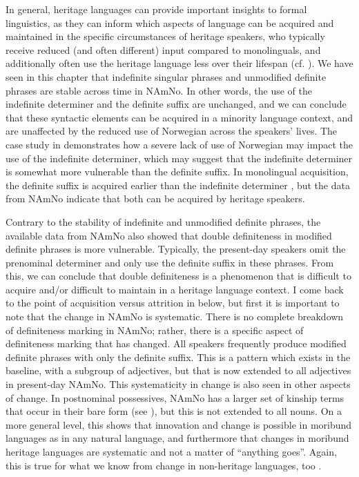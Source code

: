 \documentclass[output=paper]{langscibook}
\begin{document}
In general, heritage languages can provide important insights to formal linguistics, as they can inform which aspects of language can be acquired and maintained in the specific circumstances of heritage speakers, who typically receive reduced (and often different) input compared to monolinguals, and additionally often use the heritage language less over their lifespan (cf. \citealt{Benmamoun2021, Lohndal2021}). We have seen in this chapter that indefinite singular phrases and unmodified definite phrases are stable across time in NAmNo. In other words, the use of the indefinite determiner and the definite suffix are unchanged, and we can conclude that these syntactic elements can be acquired in a minority language context, and are unaffected by the reduced use of Norwegian across the speakers' lives. The case study in \citet{Johannessen2015Germanic} demonstrates how a severe lack of use of Norwegian may impact the use of the indefinite determiner, which may suggest that the indefinite determiner is somewhat more vulnerable than the definite suffix. In monolingual acquisition, the definite suffix is acquired earlier than the indefinite determiner \citep[229--230]{KupischEtAl2009}, but the data from NAmNo indicate that both can be acquired by heritage speakers.
 
Contrary to the stability of indefinite and unmodified definite phrases, the available data from NAmNo also showed that double definiteness in modified definite phrases is more vulnerable. Typically, the present-day speakers omit the prenominal determiner and only use the definite suffix in these phrases. From this, we can conclude that double definiteness is a phenomenon that is difficult to acquire and/or difficult to maintain in a heritage language context. I come back to the point of acquisition versus attrition in  below, but first it is important to note that the change in NAmNo is systematic. There is no complete breakdown of definiteness marking in NAmNo; rather, there is a specific aspect of definiteness marking that has changed. All speakers frequently produce modified definite phrases with only the definite suffix. This is a pattern which exists in the baseline, with a subgroup of adjectives, but that is now extended to all adjectives in present-day NAmNo. This systematicity in change is also seen in other aspects of change. In postnominal possessives, NAmNo has a larger set of kinship terms that occur in their bare form (see \citealt{Kinn2021, chapters/kinn}), but this is not extended to all nouns. On a more general level, this shows that innovation and change is possible in moribund languages as in any natural language, and furthermore that changes in moribund heritage languages are systematic and not a matter of “anything goes”. Again, this is true for what we know from change in non-heritage languages, too \citep[cf.][]{KupischPolinsky2022}.
 
\end{document}
